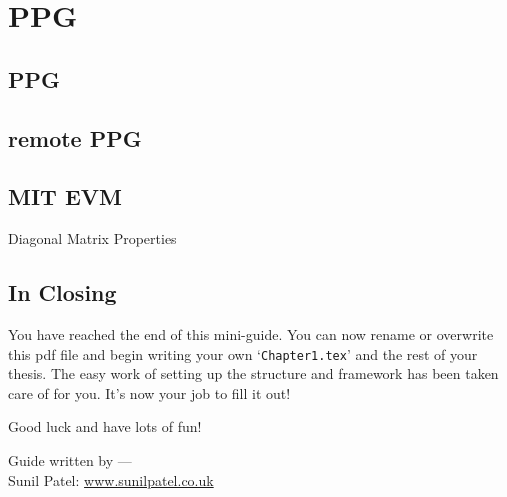 \chapter{PPG} %

\label{Chapter5} %


\section{PPG}
\section{remote PPG}
\section{MIT EVM}
\begin{compactitem}

\item Diagonal Matrix Properties
\end{compactitem}


\section{In Closing}

You have reached the end of this mini-guide. You can now rename or overwrite this pdf file and begin writing your own `\texttt{Chapter1.tex}' and the rest of your thesis. The easy work of setting up the structure and framework has been taken care of for you. It's now your job to fill it out!

Good luck and have lots of fun!

\begin{flushright}
Guide written by ---\\
Sunil Patel: \href{http://www.sunilpatel.co.uk}{www.sunilpatel.co.uk}
\end{flushright}
